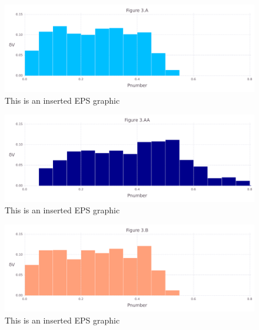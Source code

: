 \documentclass[10pt,letterpaper]{article}
\begin{document}
\begin{figure}[ht]
\begin{center}
\includegraphics[scale=0.5]{1hvr_hol/3afigure_hi-precision.pdf}
\caption{This is an inserted EPS graphic}
\label{fig7}
\end{center}
\end{figure}

\begin{figure}[ht]
\begin{center}
\includegraphics[scale=0.5]{1hvr_hol/3aafigure_hi-precision.pdf}
\caption{This is an inserted EPS graphic}
\label{fig8}
\end{center}
\end{figure}

\begin{figure}[ht]
\begin{center}
\includegraphics[scale=0.5]{1hvr_hol/3bfigure_hi-precision.pdf}
\caption{This is an inserted EPS graphic}
\label{fig10}
\end{center}
\end{figure}
\end{document}
